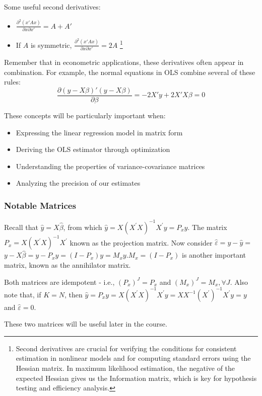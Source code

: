 Some useful second derivatives:
\begin{itemize}
   \item \(\frac{\partial^2(x'Ax)}{\partial x\partial x'} = A + A'\)
   \item If \(A\) is symmetric, \(\frac{\partial^2(x'Ax)}{\partial x\partial x'} = 2A\) \footnote{Second derivatives are crucial for verifying the conditions for consistent estimation in nonlinear models and for computing standard errors using the Hessian matrix. In maximum likelihood estimation, the negative of the expected Hessian gives us the Information matrix, which is key for hypothesis testing and efficiency analysis.}
\end{itemize}

Remember that in econometric applications, these derivatives often appear in combination. For example, the normal equations in OLS combine several of these rules:
\[ \frac{\partial(y-X\beta)'(y-X\beta)}{\partial\beta} = -2X'y + 2X'X\beta = 0 \]

These concepts will be particularly important when:
\begin{itemize}
    \item Expressing the linear regression model in matrix form
    \item Deriving the OLS estimator through optimization
    \item Understanding the properties of variance-covariance matrices
    \item Analyzing the precision of our estimates
\end{itemize}

\subsubsection{Notable Matrices}
Recall that $\widehat{y}=X \widehat{\beta}$, from which $\widehat{y}=X\left(X^{\prime} X\right)^{-1} X^{\prime} y=P_{x} y$. The matrix $P_{x}=X\left(X^{\prime} X\right)^{-1} X^{\prime}$ known as the projection matrix. Now consider $\widehat{\varepsilon}=y-\widehat{y}=$ $y-X \widehat{\beta}=y-P_{x} y=\left(I-P_{x}\right) y=M_{x} y . M_{x}=\left(I-P_{x}\right)$ is another important matrix, known as the annihilator matrix.

Both matrices are idempotent - i.e., $\left(P_{x}\right)^{J}=P_{x}$ and $\left(M_{x}\right)^{J}=M_{x}, \forall J$. Also note that, if $K=N$, then $\widehat{y}=P_{x} y=X\left(X^{\prime} X\right)^{-1} X^{\prime} y=X X^{-1}\left(X^{\prime}\right)^{-1} X^{\prime} y=y$ and $\widehat{\varepsilon}=0$.

These two matrices will be useful later in the course.